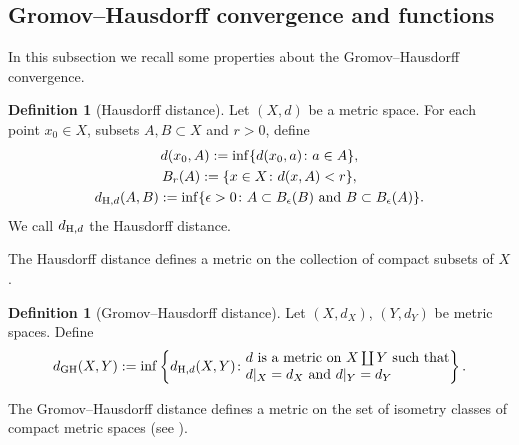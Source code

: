\documentclass[10pt,a4paper]{amsart}
\numberwithin{equation}{section}
\theoremstyle{definition}
\newtheorem{Def}[Thm]{Definition}
\begin{document}
\subsection{Gromov--Hausdorff convergence and functions}
In this subsection we recall some properties about the Gromov--Hausdorff convergence.
\begin{Def}[Hausdorff distance]\label{Dhau}
Let $(X,d)$ be a metric space.
For each point $x_0\in X$, subsets $A,B\subset X$ and $r>0$, define
\begin{gather*}
d(x_0,A):=\inf\{d(x_0,a)\colon a\in A\},
\\
B_{r}(A):=\{x\in X\colon d(x,A)<r\},
\\
d_{{\rm H},d}(A,B):=\inf\{\epsilon>0\colon A\subset B_{\epsilon}(B) \text{ and } B\subset B_{\epsilon}(A)\}.
\end{gather*}
We call $d_{{\rm H},d}$ the Hausdorff distance.
\end{Def}
The Hausdorff distance defines a metric on the collection of compact subsets of $X$.
\begin{Def}[Gromov--Hausdorff distance]\label{DGH}
Let $(X,d_X)$, $(Y,d_Y)$ be metric spaces.
Define
\[
d_{{\rm GH}}(X,Y):=\inf\left\{d_{{\rm H},d}(X,Y)\colon \begin{array}{@{}l@{}}\text{$d$ is a metric on $X\coprod Y$ such that}\\
\text{$d|_X=d_X$ and $d|_Y=d_Y$}
\end{array}\right\} .
\]
\end{Def}
The Gromov--Hausdorff distance defines a metric on the set of isometry classes of compact metric spaces (see \cite[Proposition~11.1.3]{Pe3}).
\end{document}
